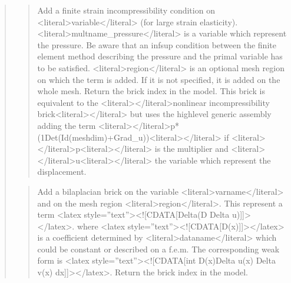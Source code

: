 \documentclass[a4paper,11pt,english]{sphinxmanual}
\begin{document}
\begin{quote}
\begin{quote}
\sphinxAtStartPar
Add a finite strain incompressibility condition on \textless{}literal\textgreater{}variable\textless{}/literal\textgreater{} (for large
strain elasticity). \textless{}literal\textgreater{}multname\_pressure\textless{}/literal\textgreater{}
is a variable which represent the pressure. Be aware that an inf\sphinxhyphen{}sup
condition between the finite element method describing the pressure and the
primal variable has to be satisfied. \textless{}literal\textgreater{}region\textless{}/literal\textgreater{} is an optional mesh region on
which the term is added. If it is not specified, it is added on the
whole mesh. Return the brick index in the model.
This brick is equivalent to the \textless{}literal\textgreater{}\textless{}/literal\textgreater{}nonlinear incompressibility brick\textless{}literal\textgreater{}\textless{}/literal\textgreater{} but
uses the high\sphinxhyphen{}level generic assembly adding the term
\textless{}literal\textgreater{}\textless{}/literal\textgreater{}p*(1\sphinxhyphen{}Det(Id(meshdim)+Grad\_u))\textless{}literal\textgreater{}\textless{}/literal\textgreater{} if \textless{}literal\textgreater{}\textless{}/literal\textgreater{}p\textless{}literal\textgreater{}\textless{}/literal\textgreater{} is the multiplier and
\textless{}literal\textgreater{}\textless{}/literal\textgreater{}u\textless{}literal\textgreater{}\textless{}/literal\textgreater{} the variable which represent the displacement.
\end{quote}

\sphinxAtStartPar
{}
\begin{quote}

\sphinxAtStartPar
Add a bilaplacian brick on the variable
\textless{}literal\textgreater{}varname\textless{}/literal\textgreater{} and on the mesh region \textless{}literal\textgreater{}region\textless{}/literal\textgreater{}.
This represent a term \textless{}latex style=”text”\textgreater{}\textless{}!{[}CDATA{[}Delta(D Delta u){]}{]}\textgreater{}\textless{}/latex\textgreater{}.
where \textless{}latex style=”text”\textgreater{}\textless{}!{[}CDATA{[}D(x){]}{]}\textgreater{}\textless{}/latex\textgreater{} is a coefficient determined by \textless{}literal\textgreater{}dataname\textless{}/literal\textgreater{} which
could be constant or described on a f.e.m. The corresponding weak form
is \textless{}latex style=”text”\textgreater{}\textless{}!{[}CDATA{[}int D(x)Delta u(x) Delta v(x) dx{]}{]}\textgreater{}\textless{}/latex\textgreater{}.
Return the brick index in the model.
\end{quote}


\end{quote}
\end{document}
